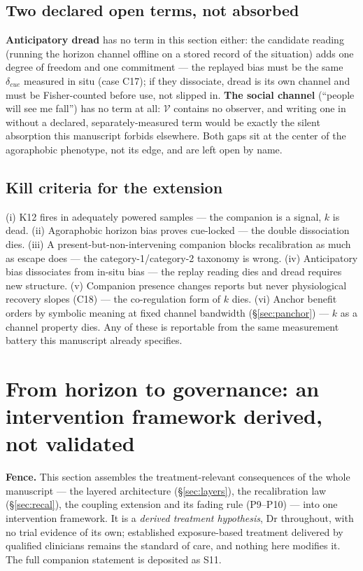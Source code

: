\documentclass[9pt,twocolumn]{article}
\newcommand{\Vset}{\mathcal{V}}
\begin{document}
\subsection{Two declared open terms, not absorbed}
\textbf{Anticipatory dread} has no term in this section either: the candidate reading (running the horizon channel offline on a stored record of the situation) adds one degree of freedom and one commitment --- the replayed bias must be the same $\delta_{cue}$ measured in situ (case C17); if they dissociate, dread is its own channel and must be Fisher-counted before use, not slipped in. \textbf{The social channel} (``people will see me fall'') has no term at all: $\Vset$ contains no observer, and writing one in without a declared, separately-measured term would be exactly the silent absorption this manuscript forbids elsewhere. Both gaps sit at the center of the agoraphobic phenotype, not its edge, and are left open by name.

\subsection{Kill criteria for the extension}
(i) K12 fires in adequately powered samples --- the companion is a signal, $k$ is dead. (ii) Agoraphobic horizon bias proves cue-locked --- the double dissociation dies. (iii) A present-but-non-intervening companion blocks recalibration as much as escape does --- the category-1/category-2 taxonomy is wrong. (iv) Anticipatory bias dissociates from in-situ bias --- the replay reading dies and dread requires new structure. (v) Companion presence changes reports but never physiological recovery slopes (C18) --- the co-regulation form of $k$ dies. (vi) Anchor benefit orders by symbolic meaning at fixed channel bandwidth (\S\ref{sec:panchor}) --- $k$ as a channel property dies. Any of these is reportable from the same measurement battery this manuscript already specifies.

\section{From horizon to governance: an intervention framework derived, not validated}
\label{sec:rgif}
\textbf{Fence.} This section assembles the treatment-relevant consequences of the whole manuscript --- the layered architecture (\S\ref{sec:layers}), the recalibration law (\S\ref{sec:recal}), the coupling extension and its fading rule (P9--P10) --- into one intervention framework. It is a \emph{derived treatment hypothesis}, Dr throughout, with no trial evidence of its own; established exposure-based treatment delivered by qualified clinicians remains the standard of care, and nothing here modifies it. The full companion statement is deposited as S11.
\end{document}
